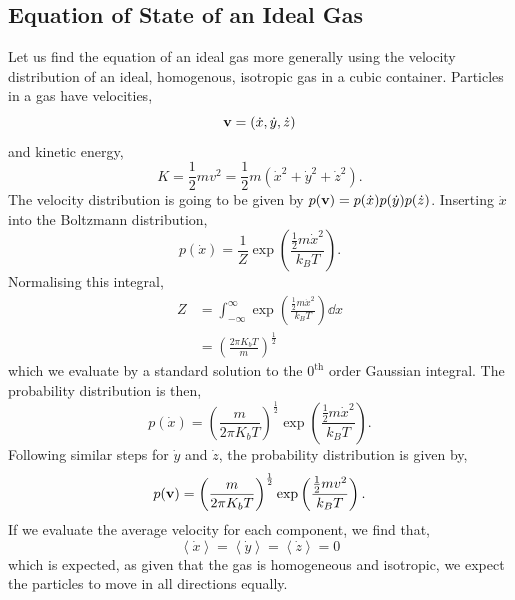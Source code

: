 \documentclass{book}
\begin{document}
\subsection{Equation of State of an Ideal Gas}
Let us find the equation of an ideal gas more generally using the velocity distribution of an ideal, homogenous, isotropic gas in a cubic container. Particles in a gas have velocities,
\begin{equation}
	\vb{v} = \left(\Dot{x}, \Dot{y}, \Dot{z}\right) 
\end{equation}
and kinetic energy,
\begin{equation}
	K = \frac{1}{2}mv^2 = \frac{1}{2}m\left(\Dot{x}^2 + \Dot{y}^2 + \Dot{z}^2\right).
\end{equation}
The velocity distribution is going to be given by $p(\vb{v}) = p(\Dot{x})p(\Dot{y})p(\Dot{z})$. Inserting $\Dot{x}$ into the Boltzmann distribution,
\begin{equation}
	p(\Dot{x}) = \frac{1}{Z} \exp\left(\frac{\frac{1}{2}m\Dot{x}^2}{k_BT}\right).
\end{equation}
Normalising this integral,
\begin{equation}
	\begin{split}
	Z &= \int_{-\infty}^{\infty}\exp\left(\frac{\frac{1}{2}m\Dot{x}^2}{k_BT}\right) \dd{x}
	\\ & = \left(\frac{2\pi K_bT}{m}\right)^{\frac{1}{2}}
	\end{split}
\end{equation}
which we evaluate by a standard solution to the $0^{\text{th}}$ order Gaussian integral. The probability distribution is then,
\begin{equation}
	p(\Dot{x}) = \left(\frac{m}{2\pi K_bT}\right)^{\frac{1}{2}} \exp\left(\frac{\frac{1}{2}m\Dot{x}^2}{k_BT}\right).
\end{equation}
Following similar steps for $\Dot{y}$ and $\Dot{z}$, the probability distribution is given by,
\begin{equation}
	p(\vb{v}) = \left(\frac{m}{2\pi K_bT}\right)^{\frac{1}{2}} \exp\left(\frac{\frac{1}{2}mv^2}{k_BT}\right).
\end{equation}
If we evaluate the average velocity for each component, we find that,
\begin{equation}
	\left<\Dot{x}\right> = \left<\Dot{y}\right> = \left<\Dot{z}\right> = 0
\end{equation}
which is expected, as given that the gas is homogeneous and isotropic, we expect the particles to move in all directions equally.
\end{document}

